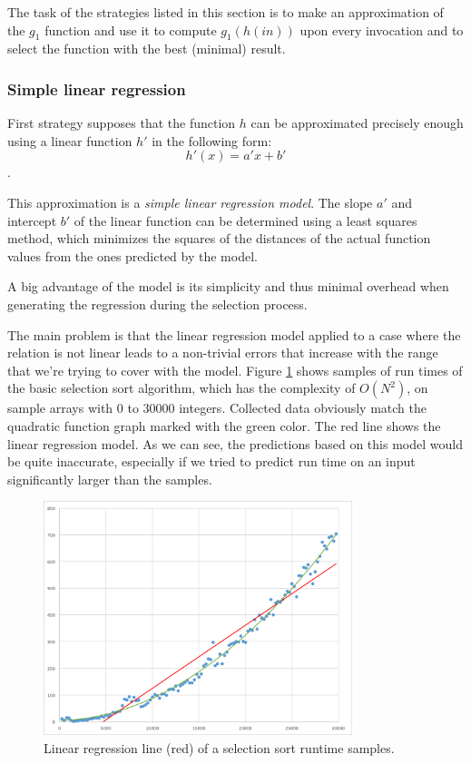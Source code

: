 The task of the strategies listed in this section is to make an approximation of the \(g_1\) function and use it to compute \(g_1(h(in))\) upon every invocation and to select the function with the best (minimal) result.

\subsubsection{Simple linear regression}
\label{subsubsec:simple_linear_regression}

First strategy supposes that the function \(h\) can be approximated precisely enough using a linear function \(h'\) in the following form:
\[h'(x) = a' x + b'\].

This approximation is a \textit{simple linear regression model}. The slope \(a'\) and intercept \(b'\) of the linear function can be determined using a least squares method, which minimizes the squares of the distances of the actual function values from the ones predicted by the model.

A big advantage of the model is its simplicity and thus minimal overhead when generating the regression during the selection process. 

The main problem is that the linear regression model applied to a case where the relation is not linear leads to a non-trivial errors that increase with the range that we're trying to cover with the model. Figure \ref{fig:selection_sort_linear_trendline} shows samples of run times of the basic selection sort algorithm, which has the complexity of \(O(N^2)\), on sample arrays with 0 to 30000 integers. Collected data obviously match the quadratic function graph marked with the green color. The red line shows the linear regression model. As we can see, the predictions based on this model would be quite inaccurate, especially if we tried to predict run time on an input significantly larger than the samples.

\begin{figure}[h!]
	\centerline{\mbox{\includegraphics[width=90mm]{./img/selection_sort_linear_trendline.png}}}
	\caption{Linear regression line (red) of a selection sort runtime samples.}
	\label{fig:selection_sort_linear_trendline}
\end{figure}


